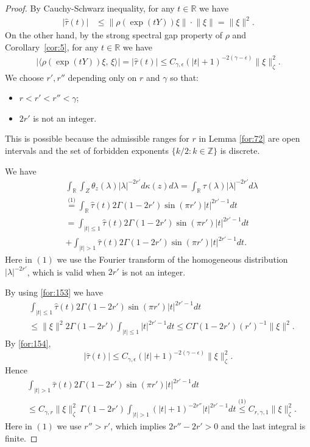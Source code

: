 \documentclass[11 pt]{amsart}
\newcommand{\RR}{\mathbb{R}}
\newcommand{\R}{\mathbb{R}}
\newcommand{\norm}[1]{\lVert#1\rVert}
\theoremstyle{definition}
\numberwithin{equation}{section}
\begin{document}
\begin{proof}
 By Cauchy-Schwarz inequality, for any $t\in\RR$ we have
\begin{align}\label{for:153}
|\hat{\tau}(t)|&\leq \|\rho(\exp(tY))\xi\|\cdot \norm{\xi}=\norm{\xi}^2.
\end{align}
On the other hand, by the strong spectral gap property of $\rho$ and
Corollary~\ref{cor:5}, for any $t\in\RR$ we have
\begin{align}\label{for:154}
\Big|\big\langle \rho(\exp(tY))\xi,\,\xi\big\rangle\Big|=|\hat{\tau}(t)|\leq C_{\gamma,\epsilon}(|t|+1)^{-2(\gamma-\epsilon)} \big\|\xi\big\|^2_{\zeta}. \end{align}
We choose $r',r''$ depending only on $r$ and $\gamma$ so that:
\begin{itemize}
  \item[(a)] $r<r'<r''<\gamma$;
 \item[(b)] $2r'$ is not an integer.
\end{itemize}
This is possible because the admissible ranges for $r$ in Lemma \ref{for:72} are open intervals and the set of forbidden exponents $\{k/2: k\in\mathbb{Z}\}$ is discrete.

We have
\begin{align*}
&\int_{\R}\int_Z\theta_z(\lambda)|\lambda|^{-2r'} d\kappa(z)d\lambda=\int_{\R}\tau(\lambda)|\lambda|^{-2r'} d\lambda\\
&\overset{\text{(1)}}{=}\int_{\R}\hat{\tau}(t)2\Gamma(1-2r') \sin( \pi r' )|t|^{2r'-1}dt \\
  &= \int_{|t|\leq1}\hat{\tau}(t)2\Gamma(1-2r') \sin( \pi r' )|t|^{2r'-1}dt\\
  &+\int_{|t|>1}\hat{\tau}(t)2\Gamma(1-2r') \sin( \pi r' )|t|^{2r'-1}dt.
\end{align*}
Here in $(1)$ we use the Fourier transform of the homogeneous distribution $|\lambda|^{-2r'}$, which is valid when $2r'$ is not an integer.

By using \eqref{for:153} we have
\begin{align*}
&\int_{|t|\leq1}\hat{\tau}(t)2\Gamma(1-2r') \sin( \pi r' )|t|^{2r'-1}dt\\
&\leq  \norm{\xi}^2 2\Gamma(1-2r')\int_{|t|\leq1}|t|^{2r'-1}dt\leq C\Gamma(1-2r')(r')^{-1}\big\|\xi\big\|^2.
\end{align*}
By \eqref{for:154},
\[
  |\hat{\tau}(t)| \le C_{\gamma,\epsilon}(|t|+1)^{-2(\gamma-\epsilon)}\|\xi\|_\zeta^2.
\]
Hence
\begin{align*}
 &\int_{|t|>1}\hat{\tau}(t)2\Gamma(1-2r') \sin( \pi r' )|t|^{2r'-1}dt\\
&\leq C_{\gamma,r}\big\|\xi\big\|_{\zeta}^2\,\Gamma(1-2r')\int_{|t|>1}(|t|+1)^{-2r''}   |t|^{2r'-1}dt\overset{\text{(1)}}{\leq} C_{r,\gamma,1}\big\|\xi\big\|_{\zeta}^2.
\end{align*}
Here in $(1)$ we use $r''>r'$, which  implies $2r''-2r'>0$ and the last integral is finite.


\end{proof}
\end{document}
